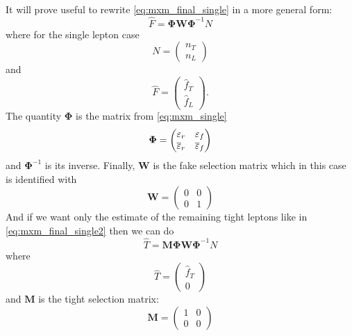 It will prove useful to rewrite \eqn\eqref{eq:mxm_final_single}
in a more general form:
\begin{equation}
\label{eq:mxm_general}
\hat{F} = \mathbf{\Phi}\mathbf{W}\mathbf{\Phi}^{-1} N
\end{equation}
where for the single lepton case
\begin{equation}
N=\begin{pmatrix} n_T \\ n_L\end{pmatrix}
\end{equation}
and 
\begin{equation}
\hat{F}=\begin{pmatrix} \hat{f}_T \\ \hat{f}_L\end{pmatrix}.
\end{equation}
The quantity $\mathbf{\Phi}$ is the matrix from \eqn\eqref{eq:mxm_single}
\begin{equation}
\mathbf{\Phi} = 
  \begin{pmatrix}
  \varepsilon_r& \varepsilon_f\\ \overline{\varepsilon}_r& \overline{\varepsilon}_f
  \end{pmatrix} 
\end{equation}
and $\mathbf{\Phi}^{-1}$ is its inverse. Finally, $\mathbf{W}$
is the fake selection matrix which in this case is identified with
\begin{equation}
\mathbf{W}=\begin{pmatrix} 0 & 0 \\ 0 & 1 \end{pmatrix}
\end{equation}
And if we want only the estimate of the remaining tight leptons
like in \eqn\eqref{eq:mxm_final_single2}
then we can do 
\begin{equation}
\label{eq:mxm_general_tight}
\hat{T} = \mathbf{M}\mathbf{\Phi}\mathbf{W}\mathbf{\Phi}^{-1} N
\end{equation}
where 
\begin{equation}
\hat{T}=\begin{pmatrix} \hat{f}_T \\ 0 \end{pmatrix}
\end{equation}
and $\mathbf{M}$ is the tight selection matrix:
\begin{equation}
\mathbf{M}=\begin{pmatrix} 1 & 0 \\ 0 & 0 \end{pmatrix}
\end{equation}




